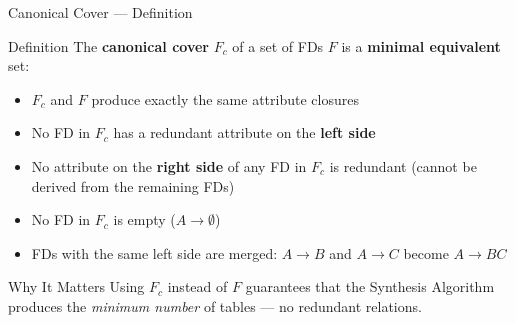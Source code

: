 \begin{frame}{Canonical Cover --- Definition}
  \begin{block}{Definition}
    The \textbf{canonical cover} $F_c$ of a set of FDs $F$ is a
    \textbf{minimal equivalent} set:
    \begin{itemize}
      \item $F_c$ and $F$ produce exactly the same attribute closures
      \item No FD in $F_c$ has a redundant attribute on the \textbf{left side}
      \item No attribute on the \textbf{right side} of any FD in $F_c$ is
            redundant (cannot be derived from the remaining FDs)
      \item No FD in $F_c$ is empty ($A \to \emptyset$)
      \item FDs with the same left side are merged: $A \to B$ and $A \to C$
            become $A \to BC$
    \end{itemize}
  \end{block}

  \begin{block}{Why It Matters}
    Using $F_c$ instead of $F$ guarantees that the Synthesis Algorithm produces
    the \emph{minimum number} of tables --- no redundant relations.
  \end{block}
\end{frame}

